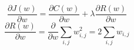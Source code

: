 \[
    \frac{\partial J(w)}{\partial w} = \frac{\partial C(w)}{\partial w} + \lambda \frac{\partial R(w)}{\partial w}    
\]
\[
    \frac{\partial R(w)}{\partial w} = \frac{\partial}{\partial w} \sum_{i,j} w_{i,j}^2 = 2 \sum_{i,j} w_{i,j} 
\]